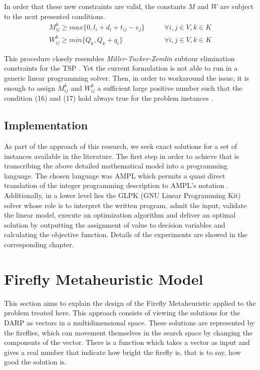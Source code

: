 \documentclass[tuberlin,cic,tc,openright,english,noabntcite,oneside]{iiufrgs}
\begin{document}
In order that these new constraints are valid, the constants $M$ and $W$ are subject to the next presented conditions.
\begin{align}
	M_{ij}^k \geq max\{0, l_i+d_i+t_{ij} - e_j\}	\qquad & \forall i,j \in V, k \in K \\
	W_{ij}^k \geq min\{Q_k, Q_k+q_i\}				\qquad & \forall i,j \in V, k \in K
\end{align}

This procedure closely resembles \emph{Miller-Tucker-Zemlin} subtour elimination constraints for the TSP \parencite[p. 575]{cordeau_branch-and-cut_2006}. Yet the current formulation is not able to run in a generic linear programming solver. Then, in order to workaround the issue, it is enough to assign $M_{ij}^k$ and $W_{ij}^k$ a sufficient large positive number such that the condition (16) and (17) hold always true for the problem instances \parencite[p. 44]{hall_integrated_2009}.

\subsection{Implementation}
As part of the approach of this research, we seek exact solutions for a set of instances available in the literature. The first step in order to achieve that is transcribing the above detailed mathematical model into a programming language. The chosen language was AMPL which permits a quasi direct translation of the integer programming description to AMPL's notation \parencite[p. 520]{fourer_modeling_1990}. Additionally, in a lower level lies the GLPK (GNU Linear Programming Kit) solver whose role is to interpret the written program, admit the input, validate the linear model, execute an optimization algorithm and deliver an optimal solution by outputting the assignment of value to decision variables and calculating the objective function. Details of the experiments are showed in the corresponding chapter.

\section{Firefly Metaheuristic Model}
This section aims to explain the design of the Firefly Metaheuristic applied to the problem treated here. This approach consists of viewing the solutions for the DARP as vectors in a multidimensional space. These solutions are represented by the fireflies, which can movement themselves in the search space by changing the components of the vector. There is a function which takes a vector as input and gives a real number that indicate how bright the firefly is, that is to say, how good the solution is.
\end{document}
